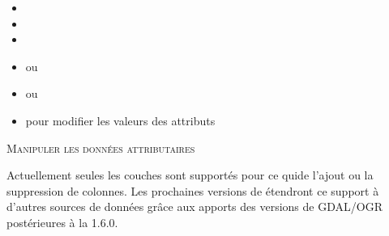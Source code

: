 \begin{itemize}[label=--]
\item {}
\item {}
\item {}
\item {} ou 
\item {} ou 
\item {} pour modifier les valeurs des attributs
\end{itemize}

\begin{Tip}[ht]\caption{\textsc{Manipuler les données attributaires}}
Actuellement seules les couches \pg sont supportés pour ce quide l'ajout ou la suppression de colonnes. Les prochaines versions de \qg étendront ce support à d'autres sources de données grâce aux apports des versions de GDAL/OGR postérieures à la 1.6.0.
\end{Tip}

